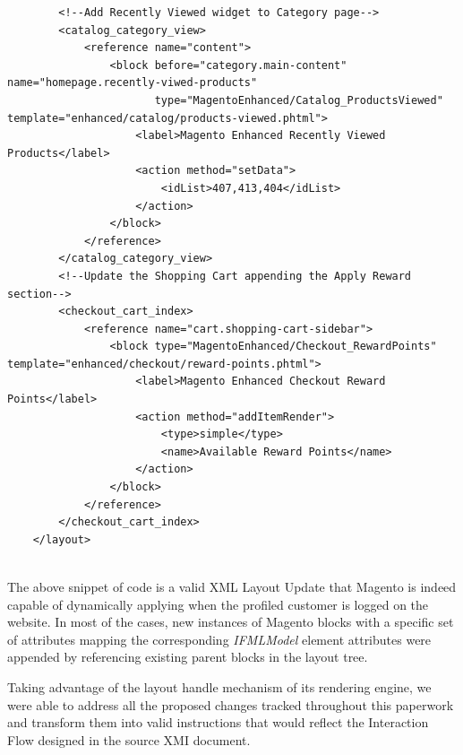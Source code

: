 \begin{lstlisting}
        <!--Add Recently Viewed widget to Category page-->
        <catalog_category_view>
            <reference name="content">
                <block before="category.main-content" name="homepage.recently-viwed-products"
                       type="MagentoEnhanced/Catalog_ProductsViewed" template="enhanced/catalog/products-viewed.phtml">
                    <label>Magento Enhanced Recently Viewed Products</label>
                    <action method="setData">
                        <idList>407,413,404</idList>
                    </action>
                </block>
            </reference>
        </catalog_category_view>
        <!--Update the Shopping Cart appending the Apply Reward section-->
        <checkout_cart_index>
            <reference name="cart.shopping-cart-sidebar">
                <block type="MagentoEnhanced/Checkout_RewardPoints" template="enhanced/checkout/reward-points.phtml">
                    <label>Magento Enhanced Checkout Reward Points</label>
                    <action method="addItemRender">
                        <type>simple</type>
                        <name>Available Reward Points</name>
                    </action>
                </block>
            </reference>
        </checkout_cart_index>
    </layout>
    
\end{lstlisting}
\vspace{0.5cm}

The above snippet of code is a valid XML Layout Update that Magento is indeed capable of dynamically applying when the profiled customer is logged on the website.
\newpage
In most of the cases, new instances of Magento blocks with a specific set of attributes mapping the corresponding \textit{IFMLModel} element attributes were appended by referencing existing parent blocks in the layout tree. 

Taking advantage of the layout handle mechanism of its rendering engine, we were able to address all the proposed changes tracked throughout this paperwork and transform them into valid instructions that would reflect the Interaction Flow designed in the source XMI document. 

